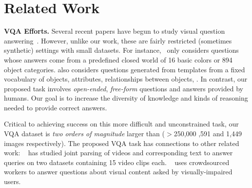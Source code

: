 \section{Related Work}
\label{sec:related}
\textbf{VQA Efforts.}
Several recent papers have begun to study visual question answering~\cite{geman,fritz,SongChun_video_queries,vizwiz}.
However, unlike our work, these are fairly restricted (sometimes synthetic) settings with small datasets.
For instance,~\cite{fritz} only considers
questions whose answers come from a predefined closed world of
16 basic colors or 894 object categories.
\cite{geman}
also considers questions generated from templates from a fixed vocabulary of objects, attributes,
relationships between objects, \etc.
In contrast, our proposed task involves \emph{open-ended}, \emph{free-form}
questions and answers provided by humans.
Our goal is to increase the diversity of knowledge and
kinds of reasoning needed to provide correct answers.
\begin{comment}
Our task is unconstrained, since it does not
provide ground-truth image annotations to help the answering system (human or machine).
For instance, in \cite{geman}, a question
might be \quotes{Is there a person in the \emph{designated region}?}, whereas in VQA, the question
might be \quotes{Is there a person to the left of the brown chair?}. Thus, our task requires a
deeper understanding of the textual and visual worlds along with their complex interaction.
\end{comment} 
Critical to
achieving success on this more difficult and unconstrained task, our VQA dataset is \emph{two orders of magnitude} larger than \cite{geman,fritz}
($>$250,000 ,591 and 1,449 images respectively). The proposed VQA task has connections to other related work:  ~\cite{SongChun_video_queries} has studied joint parsing of videos and corresponding text to answer queries on two datasets containing 15 video clips each. ~\cite{vizwiz} uses crowdsourced workers to answer questions about visual content asked by visually-impaired users.
